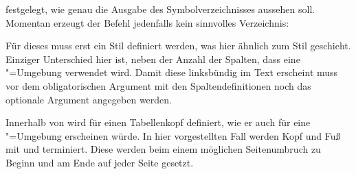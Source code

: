\documentclass[english,ngerman]{tudscrartcl}
\begin{document}
festgelegt, wie genau die Ausgabe des Symbolverzeichnisses aussehen soll. 
Momentan erzeugt der Befehl  jedenfalls kein sinnvolles 
Verzeichnis:
%
\begin{Tutorial*}
\printsymbols
\end{Tutorial*}
\begin{quoting}[rightmargin=0pt]
\vspace*{-\baselineskip}
\glsdisablehyper
\printsymbols
\end{quoting}
%
Für dieses muss erst ein Stil definiert werden, was hier ähnlich zum Stil 
 geschieht. Einziger Unterschied hier ist, neben der 
Anzahl der Spalten, dass eine "=Umgebung verwendet wird. 
Damit diese linksbündig im Text erscheint muss vor dem obligatorischen Argument 
mit den Spaltendefinitionen noch das optionale Argument  angegeben 
werden.
%
\begin{Tutorial}
\end{Tutorial}
%
Innerhalb von  wird  für einen
Tabellenkopf definiert, wie er auch für eine "=Umgebung 
erscheinen würde. In hier vorgestellten Fall werden Kopf und Fuß mit 
 und  terminiert. Diese werden beim einem 
möglichen Seitenumbruch zu Beginn und am Ende auf jeder Seite gesetzt.
\end{document}
